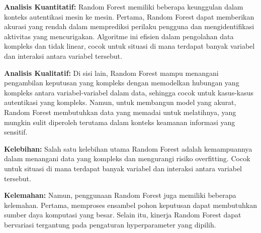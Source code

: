 \textbf{Analisis Kuantitatif:} Random Forest memiliki beberapa keunggulan dalam konteks autentikasi mesin ke mesin. Pertama, Random Forest dapat memberikan akurasi yang rendah dalam memprediksi perilaku pengguna dan mengidentifikasi aktivitas yang mencurigakan. Algoritme ini efisien dalam pengolahan data kompleks dan tidak linear, cocok untuk situasi di mana terdapat banyak variabel dan interaksi antara variabel tersebut.

\textbf{Analisis Kualitatif:} Di sisi lain, Random Forest mampu menangani pengambilan keputusan yang kompleks dengan memodelkan hubungan yang kompleks antara variabel-variabel dalam data, sehingga cocok untuk kasus-kasus autentikasi yang kompleks. Namun, untuk membangun model yang akurat, Random Forest membutuhkan data yang memadai untuk melatihnya, yang mungkin sulit diperoleh terutama dalam konteks keamanan informasi yang sensitif.

\textbf{Kelebihan:} Salah satu kelebihan utama Random Forest adalah kemampuannya dalam menangani data yang kompleks dan mengurangi risiko overfitting. Cocok untuk situasi di mana terdapat banyak variabel dan interaksi antara variabel tersebut.

\textbf{Kelemahan:} Namun, penggunaan Random Forest juga memiliki beberapa kelemahan. Pertama, memproses ensambel pohon keputusan dapat membutuhkan sumber daya komputasi yang besar. Selain itu, kinerja Random Forest dapat bervariasi tergantung pada pengaturan hyperparameter yang dipilih.
